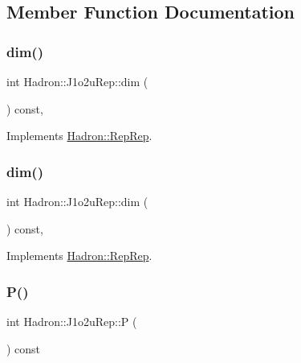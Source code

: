 \subsection{Member Function Documentation}
\mbox{\label{structHadron_1_1J1o2uRep_af458dec9c63e12a6d09f6a389bf8ad15}} 
\subsubsection{\texorpdfstring{dim()}{dim()}\hspace{0.1cm}{\footnotesize\ttfamily [1/2]}}
{\footnotesize\ttfamily int Hadron\+::\+J1o2u\+Rep\+::dim (\begin{DoxyParamCaption}{ }\end{DoxyParamCaption}) const\hspace{0.3cm}{\ttfamily [inline]}, {\ttfamily [virtual]}}



Implements \mbox{\hyperlink{structHadron_1_1RepRep_a92c8802e5ed7afd7da43ccfd5b7cd92b}{Hadron\+::\+Rep\+Rep}}.

\mbox{\label{structHadron_1_1J1o2uRep_af458dec9c63e12a6d09f6a389bf8ad15}} 
\subsubsection{\texorpdfstring{dim()}{dim()}\hspace{0.1cm}{\footnotesize\ttfamily [2/2]}}
{\footnotesize\ttfamily int Hadron\+::\+J1o2u\+Rep\+::dim (\begin{DoxyParamCaption}{ }\end{DoxyParamCaption}) const\hspace{0.3cm}{\ttfamily [inline]}, {\ttfamily [virtual]}}



Implements \mbox{\hyperlink{structHadron_1_1RepRep_a92c8802e5ed7afd7da43ccfd5b7cd92b}{Hadron\+::\+Rep\+Rep}}.

\mbox{\label{structHadron_1_1J1o2uRep_a2babc8719f93a2e2b7fa74c30f3d1b67}} 
\subsubsection{\texorpdfstring{P()}{P()}\hspace{0.1cm}{\footnotesize\ttfamily [1/2]}}
{\footnotesize\ttfamily int Hadron\+::\+J1o2u\+Rep\+::P (\begin{DoxyParamCaption}{ }\end{DoxyParamCaption}) const\hspace{0.3cm}{\ttfamily [inline]}}

